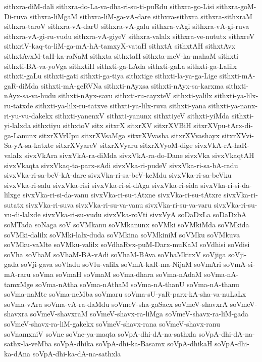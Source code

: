 {sithxra-diM-dali
sithxra-do-La-va-dha-ri-su-ti-puRdu
sithxra-go-Lisi
sithxra-goM-Di-ruva
sithxra-liMgaM
sithxra-liM-ga-vA-dare
sithxra-sithxra
sithxra-sithxraM
sithxra-taroV
sithxra-vA-darU
sithxra-vA-galu
sithxra-vAgi
sithxra-vA-gi-ruva
sithxra-vA-gi-ru-vudu
sithxra-vA-giyeV
sithxra-valalx
sithxra-ve-nututx
sithxreV
sithxriV-kaq-ta-liM-ga-mA-hA-tamxyX-vataH
sithxtA
sithxtAH
sithxtAvx
sithxtAvxM-taH-ka-raNaM
sithxta
sithxtaH
sithxta-meV-ka-mahaM
sithxti
sithxti-BA-va-yoVga
sithxtiH
sithxti-ga-LAda
sithxti-gaLa
sithxti-ga-Lalilx
sithxti-gaLu
sithxti-gati
sithxti-ga-tiya
sithxtige
sithxti-la-ya-ga-Lige
sithxti-mA-gaR-diMda
sithxti-mA-geRVNa
sithxti-nAyxsa
sithxti-nAyx-sa-karxma
sithxti-nAyx-sa-va-hudu
sithxti-nAyx-savu
sithxti-ru-cayxteV
sithxti-yalilx
sithxti-ya-lilx-ru-tatxde
sithxti-ya-lilx-ru-tatxve
sithxti-ya-lilx-ruva
sithxti-yana
sithxti-ya-nanx-ri-yu-vu-dakekx
sithxti-yanenxV
sithxti-yanunx
sithxtiyeV
sithxti-yiMda
sithxti-yi-lalxda
sithxtiyu
sithxtoV
sitx
sitxrX
sitxrXV
sitxrXVBiH
sitxrXVpu-tArx-di-ga-Lanunx
sitxrXVrUpu
sitxrXVsaMga
sitxrXVvasha
sitxrXVvashayx
sitxrXVvi-Sa-yA-sa-katxte
sitxrXVyareV
sitxrXVyaru
sitxrXVyoM-dige
sivxVkA-rA-haR-valalx
sivxVkAra
sivxVkA-ra-diMda
sivxVkA-ra-do-Dane
sivxVka
sivxVkaqtAH
sivxVkaqta
sivxVkaq-ta-parx-sAdi
sivxVka-ri-pudeV
sivxVka-ri-sa-bA-radu
sivxVka-ri-sa-beV-kA-dare
sivxVka-ri-sa-beV-keMdu
sivxVka-ri-sa-beVku
sivxVka-ri-salu
sivxVka-risi
sivxVka-ri-si-dAga
sivxVka-ri-sida
sivxVka-ri-si-da-lilxge
sivxVka-ri-si-da-vanu
sivxVka-ri-su-tAtxne
sivxVka-ri-su-tAtxre
sivxVka-ri-sutatx
sivxVka-ri-suva
sivxVka-ri-su-va-vanu
sivxVka-ri-su-va-varu
sivxVka-ri-su-vu-di-lalxde
sivxVka-ri-su-vudu
sivxVka-roVti
sivxVyA
soDaDxLa
soDaDxbA
soMTada
soNaga
soV
soVMkanu
soVMkanunx
soVMki
soVMkiMda
soVMkida
soVMki-dalilx
soVMki-lalx-duda
soVMkina
soVMkiniM
soVMku
soVMkuva
soVMku-vaMte
soVMku-valilx
soVdhaRvx-puM-Darx-muKaM
soVdhisi
soVdisi
soVha
soVhaM
soVhaM-BA-vAdi
soVhaM-BAva
soVhaMkirxV
soVjiga
soVji-gada
soVji-gava
soVladu
soVlu-valilx
soVmA-kaR-ma-NijaM
soVmAri
soVmA-si-mA-raru
soVma
soVmaH
soVmaM
soVma-dhara
soVma-nAdaM
soVma-nA-tamxMge
soVma-nAtha
soVma-nAthaM
soVma-nA-thanU
soVma-nA-thanu
soVma-naMte
soVma-neMba
soVmaru
soVma-sU-yaR-parx-kA-sha-va-nuLaLx
soVma-vAra
soVma-vA-ra-daMdu
soVmeV-sha-gaSacx
soVmeV-shavxrA
soVmeV-shavxra
soVmeV-shavxraM
soVmeV-shavx-ra-liMga
soVmeV-shavx-ra-liM-gada
soVmeV-shavx-ra-liM-gakekx
soVmeV-shavx-rana
soVmeV-shavx-ranu
soVnamxniV
soVne
soVne-ya-maqta
soVpA-dhi-dA-na-sathxla
soVpA-dhi-dA-na-sathx-la-veMba
soVpA-dhika
soVpA-dhi-ka-Basamx
soVpA-dhikaH
soVpA-dhi-ka-dAna
soVpA-dhi-ka-dA-na-sathxla
}
